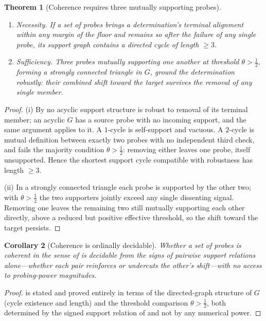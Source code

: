 \documentclass[11pt,twocolumn,a4paper]{article}
\theoremstyle{dirthm}
\newtheorem{theorem}{Theorem}[section]
\newtheorem{corollary}[theorem]{Corollary}
\theoremstyle{definition}
\theoremstyle{remark}
\begin{document}
\begin{theorem}[Coherence requires three mutually supporting probes]
\label{thm:triangle}
\leavevmode
\begin{enumerate}[label=\textup{(\roman*)},leftmargin=2.0em,itemsep=2pt]
\item \emph{Necessity.} If a set of probes brings a determination's terminal
alignment within any margin of the floor and remains so after the failure of
any single probe, its support graph contains a directed cycle of length
$\ge3$.
\item \emph{Sufficiency.} Three probes mutually supporting one another at
threshold $\theta>\tfrac12$, forming a strongly connected triangle in $G$,
ground the determination robustly: their combined shift toward the target
survives the removal of any single member.
\end{enumerate}
\end{theorem}

\begin{proof}
(i) By  no acyclic support structure is robust to
removal of its terminal member; an acyclic $G$ has a source probe with no
incoming support, and the same argument applies to it. A $1$-cycle is
self-support and vacuous. A $2$-cycle is mutual definition between exactly two
probes with no independent third check, and fails the majority condition
$\theta>\tfrac12$: removing either leaves one probe, itself unsupported.
Hence the shortest support cycle compatible with robustness has length $\ge3$.

(ii) In a strongly connected triangle each probe is supported by the other
two; with $\theta>\tfrac12$ the two supporters jointly exceed any single
dissenting signal. Removing one leaves the remaining two still mutually
supporting each other directly, above a reduced but positive effective
threshold, so the shift toward the target persists.
\end{proof}

\begin{corollary}[Coherence is ordinally decidable]
\label{cor:ordinal}
Whether a set of probes is coherent in the sense of  is
decidable from the \emph{signs} of pairwise support relations alone---whether
each pair reinforces or undercuts the other's shift---with no access to
probing-power magnitudes.
\end{corollary}

\begin{proof}
 is stated and proved entirely in terms of the
directed-graph structure of $G$ (cycle existence and length) and the threshold
comparison $\theta>\tfrac12$, both determined by the signed support relation
of  and not by any numerical power.
\end{proof}
\end{document}
